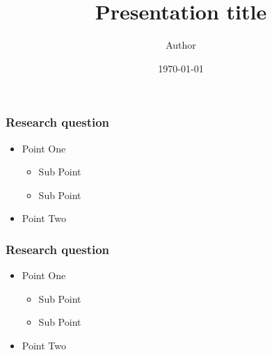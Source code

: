 \documentclass{beamer}
\title{Presentation title}
\author{Author}
\institute{Affiliation}
\date{\today}
\begin{document}
\frame{\titlepage}

\begin{frame}
\frametitle{Research question}
\begin{itemize}
	\item Point One 
	\begin{itemize}
		\item Sub Point
		\item Sub Point  
	\end{itemize}
 	\item Point Two
\end{itemize}
\end{frame}

\begin{frame}
\frametitle{Research question}
\begin{itemize}
	\item Point One 
	\begin{itemize}
		\item Sub Point
		\item Sub Point  
	\end{itemize}
 	\item Point Two
\end{itemize}
\end{frame}
\end{document}
